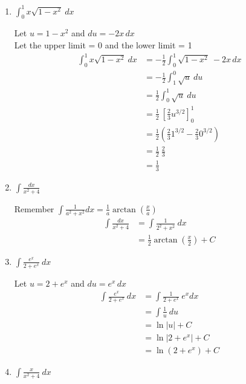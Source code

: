 \documentclass[12pt]{article}
\begin{document}
\begin{enumerate}
\item $\displaystyle\int_0^1x\sqrt{1-x^2} \ dx $

Let $u = 1-x^2$ and $du = -2x\,dx$ \\
Let the upper limit = 0 and the lower limit = 1 
\begin{equation*}
\begin{aligned}
\int_0^1x\sqrt{1-x^2} \ dx  &= -\frac{1}{2} \int_0^1\sqrt{1-x^2} \ -2x\,dx \\
&= -\frac{1}{2} \int_1^0\sqrt{u} \ du \\
&= \frac{1}{2} \int_0^1\sqrt{u} \ du \\
&= \frac{1}{2} \ \left[\frac{2}{3} u^{3/2}\right]_0^1 \\
&= \frac{1}{2} \left(\frac{2}{3} 1^{3/2} - \frac{2}{3} 0^{3/2} \right) \\
&= \frac{1}{2} \ \frac{2}{3} \\
&= \frac{1}{3}
\end{aligned}
\end{equation*}

\item $\displaystyle\int \frac{dx}{x^2+4}$

Remember $\int\frac{1}{a^2+x^2}dx = \frac{1}{a}\arctan\left(\frac{x}{a}\right)$
\begin{equation*}
\begin{aligned}
\int \frac{dx}{x^2+4} &= \int \frac{1}{2^2+x^2} \ dx \\
&=\frac{1}{2}\arctan\left(\frac{x}{2}\right) + C
\end{aligned}
\end{equation*}

\item $\displaystyle\int \frac{e^x}{2+e^x} \ dx$

Let $u = 2+e^x$ and $du = e^x\,dx$
\begin{equation*}
\begin{aligned}
\int \frac{e^x}{2+e^x} \ dx &= \int \frac{1}{2+e^x} \ e^x dx \\
&= \int \frac{1}{u} \ du \\
&= \ln |u| + C \\
&= \ln |2+e^x| + C \\
&= \ln (2+e^x) + C
\end{aligned}
\end{equation*}

\item $\displaystyle\int \frac{x}{x^2+4} \ dx$


\end{enumerate}
\end{document}
